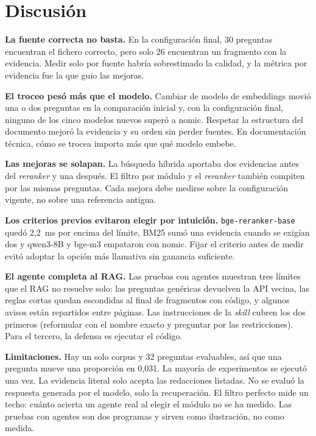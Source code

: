 \documentclass[pdflatex,sn-mathphys-num]{sn-jnl}
\begin{document}
\section{Discusión}\label{sec:discusion}

\textbf{La fuente correcta no basta.} En la configuración final, 30 preguntas encuentran el fichero correcto, pero solo 26 encuentran un fragmento con la evidencia. Medir solo por fuente habría sobrestimado la calidad, y la métrica por evidencia fue la que guio las mejoras.

\textbf{El troceo pesó más que el modelo.} Cambiar de modelo de embeddings movió una o dos preguntas en la comparación inicial y, con la configuración final, ninguno de los cinco modelos nuevos superó a nomic. Respetar la estructura del documento mejoró la evidencia y su orden sin perder fuentes. En documentación técnica, cómo se trocea importa más que qué modelo embebe.

\textbf{Las mejoras se solapan.} La búsqueda híbrida aportaba dos evidencias antes del \emph{reranker} y una después. El filtro por módulo y el \emph{reranker} también compiten por las mismas preguntas. Cada mejora debe medirse sobre la configuración vigente, no sobre una referencia antigua.

\textbf{Los criterios previos evitaron elegir por intuición.} \texttt{bge-reranker-base} quedó 2,2~ms por encima del límite, BM25 sumó una evidencia cuando se exigían dos y qwen3-8B y bge-m3 empataron con nomic. Fijar el criterio antes de medir evitó adoptar la opción más llamativa sin ganancia suficiente.

\textbf{El agente completa al RAG.} Las pruebas con agentes muestran tres límites que el RAG no resuelve solo: las preguntas genéricas devuelven la API vecina, las reglas cortas quedan escondidas al final de fragmentos con código, y algunos avisos están repartidos entre páginas. Las instrucciones de la \emph{skill} cubren los dos primeros (reformular con el nombre exacto y preguntar por las restricciones). Para el tercero, la defensa es ejecutar el código.

\textbf{Limitaciones.} Hay un solo corpus y 32 preguntas evaluables, así que una pregunta mueve una proporción en 0,031. La mayoría de experimentos se ejecutó una vez. La evidencia literal solo acepta las redacciones listadas. No se evaluó la respuesta generada por el modelo, solo la recuperación. El filtro perfecto mide un techo: cuánto acierta un agente real al elegir el módulo no se ha medido. Las pruebas con agentes son dos programas y sirven como ilustración, no como medida.
\end{document}
